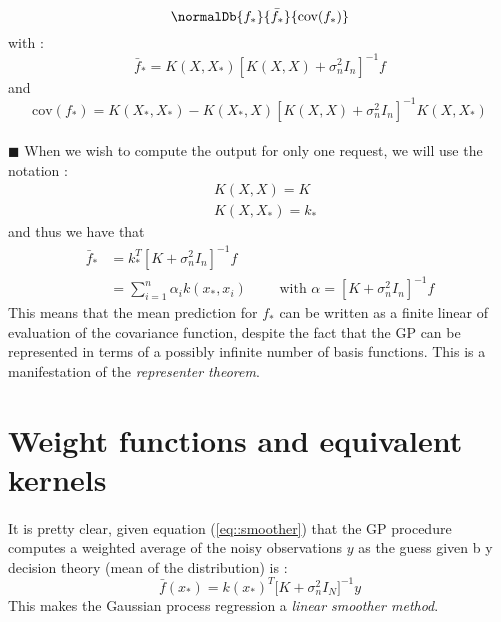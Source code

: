\documentclass[a4paper]{article}
\begin{document}
{{			\vspace{10pt}	
			{
				\begin{equation}
					\normalDb{f_*}{\bar{f}_*}{\text{cov}(f_*)}
				\end{equation}
				with : 
				\begin{equation}
					\bar{f}_* = K(X,X_*)\left[K(X,X) + \sigma_n^2I_n\right]^{-1}f
				\end{equation}
				and 
				\begin{equation}
					\text{cov}(f_*) = K(X_*,X_*) - K(X_*,X)\left[K(X,X) + \sigma_n^2I_n\right]^{-1}K(X,X_*)
				\end{equation}
			}
			
			\paragraph{} $\blacksquare$ When we wish to compute the output for only one request, we will use the notation : 
			\begin{equation}
				\begin{aligned}
					&K(X,X) = K \\
					&K(X,X_*) = k_*
				\end{aligned}
			\end{equation}
			and thus we have that 
			\begin{equation}
				\begin{aligned}
					\bar{f}_* &= k_*^T\left[ K + \sigma_n^2 I_n\right]^{-1}f\\
					              &= \sum_{i=1}^n \alpha_i k(x_*,x_i) \qquad\text{ with } \alpha = \left[ K + \sigma_n^2 I_n\right]^{-1}f
					              \label{eq::smoother}
				\end{aligned}
			\end{equation} 
			This means that the mean prediction for $f_*$ can be written as a finite linear of evaluation of the covariance function, despite the fact that the GP can be represented in terms of a possibly infinite number of basis functions. This is a manifestation of the \emph{representer theorem}. 		
		}
		
		\section{Weight functions and equivalent kernels}
		{
			\paragraph{} It is pretty clear, given equation (\ref{eq::smoother}) that the GP procedure computes a weighted average of the noisy observations $y$ as the guess given b y decision theory (mean of the distribution) is : 
			\begin{equation}
				\bar{f}(x_*) = k(x_*)^T\Big[K+\sigma_n^2I_N\Big]^{-1}y
			\end{equation}
			This makes the Gaussian process regression a \emph{linear smoother method}. 
			
}}
\end{document}
